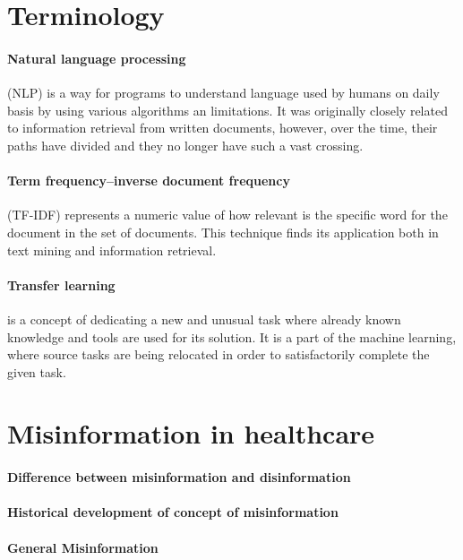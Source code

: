 \documentclass[11pt ,english,a4paper]{article}
\begin{document}
\section{Terminology}\label{ter}

\paragraph{Natural language processing} (NLP) is a way for programs to understand language used by humans on daily basis by using various algorithms an limitations. It was originally closely related to information retrieval from written documents, however, over the time, their paths have divided and they no longer have such a vast crossing. \cite{nad11natural}\cite{lid01natural}

\paragraph{Term frequency–inverse document frequency} (TF-IDF) represents a numeric value of how relevant is the specific word for the document in the set of documents. This technique finds its application both in text mining and information retrieval. \cite{chr16tfidf}  

\paragraph{Transfer learning} is a concept of dedicating a new and unusual task where already known knowledge and tools are used for its solution. It is a part of the machine learning, where source tasks are being relocated in order to satisfactorily complete the given task. \cite{chap22unmask}\cite{tor10transfer}

\section{Misinformation in healthcare}\label{mih}

\paragraph{Difference between misinformation and disinformation}
\paragraph{Historical development of concept of misinformation}

\paragraph{General Misinformation}
\end{document}
